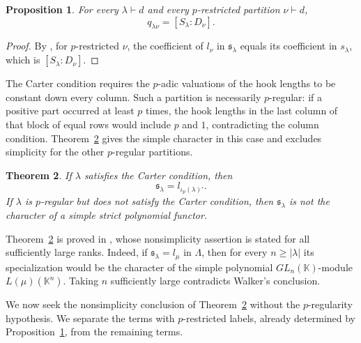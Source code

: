 \documentclass[12pt,reqno,a4paper]{amsart}
\numberwithin{equation}{section}
\numberwithin{figure}{section}
\theoremstyle{plain}
\newtheorem{theorem}{Theorem}[section]
\newtheorem{proposition}[theorem]{Proposition}
\theoremstyle{definition}
\begin{document}
\begin{proposition}
\label{prop:restricted-comparison}
For every $\lambda\vdash d$ and every $p$-restricted partition $\nu\vdash d$,
\begin{equation}\label{eq:walker-restricted-comparison}
q_{\lambda\nu}=[S_\lambda:D_\nu].
\end{equation}
\end{proposition}

\begin{proof}
By \cite[Proposition~4.2 and the preceding discussion, p.~601]{Walker},
for $p$-restricted $\nu$, the coefficient of $l_\nu$ in
$\mathfrak{s}_\lambda$ equals its coefficient in $s_\lambda$,
which is $[S_\lambda:D_\nu]$.
\end{proof}

The Carter condition requires the $p$-adic valuations of the hook
lengths to be constant down every column.  Such a partition is
necessarily $p$-regular: if a positive part occurred at least $p$
times, the hook lengths in the last column of that block of equal rows
would include $p$ and $1$, contradicting the column condition.
Theorem~\ref{thm:walker-carter-input} gives the simple character in this case and
excludes simplicity for the other $p$-regular partitions.

\begin{theorem}
\label{thm:walker-carter-input}
If $\lambda$ satisfies the Carter condition, then
\begin{equation}\label{eq:walker-carter-character}
\mathfrak{s}_\lambda=l_{\iota_p(\lambda)'}.
\end{equation}
If $\lambda$ is $p$-regular but does not satisfy the Carter condition,
then $\mathfrak{s}_\lambda$ is not the character of a simple strict
polynomial functor.
\end{theorem}

Theorem~\ref{thm:walker-carter-input} is proved in
\cite[Theorem~4.4]{Walker}, whose nonsimplicity assertion is stated
for all sufficiently large ranks.
Indeed, if $\mathfrak{s}_\lambda=l_\mu$ in $\Lambda$, then for every
$n\geq|\lambda|$ its specialization would be the character of the
simple polynomial $GL_n(\mathbb K)$-module $L(\mu)(\mathbb K^n)$.
Taking $n$ sufficiently large
contradicts Walker's conclusion.

We now seek the nonsimplicity conclusion of
Theorem~\ref{thm:walker-carter-input}
without the $p$-regularity hypothesis.
We separate the terms with $p$-restricted labels, already determined
by Proposition~\ref{prop:restricted-comparison}, from the remaining terms.
\end{document}
